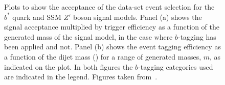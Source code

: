 \begin{figure}[!ht]
  \begin{center}
    \captionsetup[subfigure]{aboveskip=0pt,justification=centering}
  \end{center}
  \vspace{-1em}
  \caption[Plots to show the acceptance of the \summer{} data-set event selection for the $b^*$ quark and SSM $Z'$ boson signal models.]
          {Plots to show the acceptance of the \summer{} data-set event selection for the $b^*$ quark and SSM $Z'$ boson signal models.
            Panel (a) shows the signal acceptance multiplied by trigger efficiency as a
            function of the generated mass of the signal model, in the case where $b$-tagging has been applied and not.
            Panel (b) shows the event tagging efficiency as a function of the dijet mass (\mjj{})
            for a range of generated masses, $m$, as indicated on the plot.
            In both figures the $b$-tagging categories used are indicated in the legend.
            Figures taken from~\cite{dibjet-ichep_conf}.} 
  \label{fig:evt-ichep_acc}
\end{figure}

